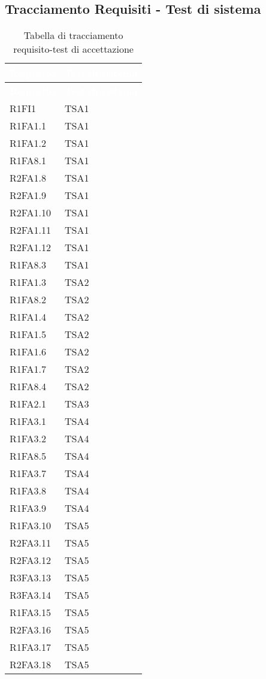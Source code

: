 \subsection{Tracciamento Requisiti - Test di sistema}
{
\renewcommand{\arraystretch}{1.5}
\centering
\begin{longtable}{C{4cm} C{4cm}}
\caption{Tabella di tracciamento requisito-test di accettazione}\\
\textcolor{white}{\textbf{Requisito}} & \textcolor{white}{\textbf{Test di sistema}}\\	
\endfirsthead
{}
\textcolor{white}{\textbf{Requisito}} & \textcolor{white}{\textbf{Test di sistema}}\\	
\endhead

R1FI1 & TSA1  \\
R1FA1.1 & TSA1  \\
R1FA1.2 & TSA1  \\
R1FA8.1 & TSA1  \\
R2FA1.8 & TSA1  \\
R2FA1.9 & TSA1  \\
R2FA1.10 & TSA1  \\
R2FA1.11 & TSA1  \\ 
R2FA1.12 & TSA1  \\ 
R1FA8.3 & TSA1  \\

R1FA1.3 & TSA2  \\
R1FA8.2 & TSA2  \\
R1FA1.4 & TSA2  \\
R1FA1.5 & TSA2  \\
R1FA1.6 & TSA2  \\
R1FA1.7 & TSA2  \\
R1FA8.4 & TSA2  \\

R1FA2.1 & TSA3  \\

R1FA3.1 & TSA4  \\
R1FA3.2 & TSA4  \\
R1FA8.5 & TSA4  \\
R1FA3.7 & TSA4  \\
R1FA3.8 & TSA4  \\
R1FA3.9 & TSA4  \\

R1FA3.10 & TSA5  \\
R2FA3.11 & TSA5  \\
R2FA3.12 & TSA5  \\
R3FA3.13 & TSA5  \\
R3FA3.14 & TSA5  \\
R1FA3.15 & TSA5  \\
R2FA3.16 & TSA5  \\
R1FA3.17 & TSA5  \\
R2FA3.18 & TSA5  \\


\end{longtable}}
